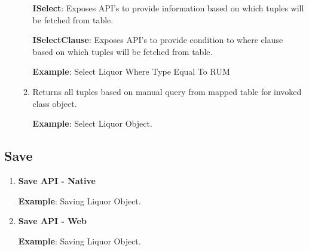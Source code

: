 \begin{enumerate}
\begin{enumerate}
						\textbf{ISelect}: Exposes API's to provide information based on which tuples will be fetched from table.
						
	
				
						\textbf{ISelectClause}: Exposes API's to provide condition to where clause based on which tuples will be fetched from table.
						

						\textbf{Example}: Select Liquor Where Type Equal To RUM
						

					\item \small 

						\par
						Returns all tuples based on manual query from mapped table for invoked class object.

						\textbf{Example}: Select Liquor Object.
						


		\end{enumerate}


		\end{enumerate}
		


	\subsection{Save}
		
		\begin{enumerate}

			\item \small \textbf{Save API - Native}
				
				

				\par
					\textbf{Example}: Saving Liquor Object.
					

			\item \small \textbf{Save API - Web}

				

				\par
					\textbf{Example}: Saving Liquor Object.
					

		\end{enumerate}



